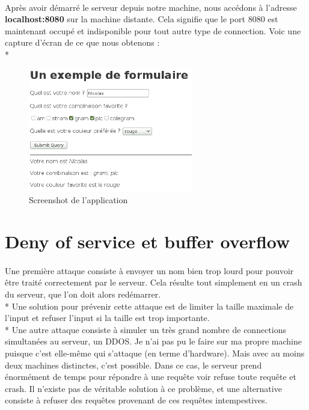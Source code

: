 \documentclass{article}
\begin{document}
\paragraph{}
Apr\`{e}s avoir d\'{e}marr\'{e} le serveur depuis notre machine, nous acc\'{e}dons \`{a} l'adresse \textbf{localhost:8080} sur la machine distante. Cela signifie que le port 8080 est maintenant occup\'{e} et indisponible pour tout autre type de connection. Voic une capture d'\'{e}cran de ce que nous obtenons :
\\*
\begin{figure}[h]
\begin{center}
\includegraphics[width=0.64\textwidth]{second}
\caption{Screenshot de l'application}
\end{center}
\end{figure}
\newpage

\section{Deny of service et buffer overflow}

\paragraph{}
Une premi\`{e}re attaque consiste \`{a} envoyer un nom bien trop lourd pour pouvoir \^{e}tre trait\'{e} correctement par le serveur. Cela r\'{e}sulte tout simplement en un crash du serveur, que l'on doit alors red\'{e}marrer. \\*
Une solution pour pr\'{e}venir cette attaque est de limiter la taille maximale de l'input et refuser l'input si la taille est trop importante. \\*
Une autre attaque consiste \`{a} simuler un tr\`{e}s grand nombre de connections simultan\'{e}es au serveur, un DDOS. Je n'ai pas pu le faire sur ma propre machine puisque c'est elle-m\^{e}me qui s'attaque (en terme d'hardware). Mais avec au moins deux machines distinctes, c'est possible. Dans ce cas, le serveur prend \'{e}norm\'{e}ment de temps pour r\'{e}pondre \`{a} une requ\^{e}te voir refuse toute requ\^{e}te et crash. Il n'existe pas de v\'{e}ritable solution \`{a} ce probl\`{e}me, et une alternative consiste \`{a} refuser des requ\^{e}tes provenant de ces requ\^{e}tes intempestives.
\end{document}
